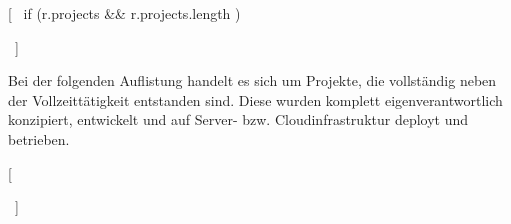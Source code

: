 [~ if (r.projects && r.projects.length ) { ~]

\begin{cvparagraph}
Bei der folgenden Auflistung handelt es sich um Projekte, die vollständig neben der Vollzeittätigkeit entstanden sind.
Diese wurden komplett eigenverantwortlich konzipiert, entwickelt und auf Server- bzw. Cloudinfrastruktur deployt und betrieben.
\end{cvparagraph}

\begin{cventries}
\end{cventries}
[~ } ~]

